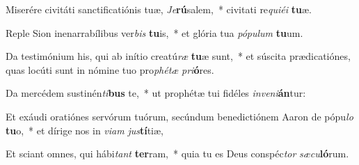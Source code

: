 \item Miserére civitáti sanctificatiónis tuæ, \textit{Je}\textbf{rú}salem,~* civitati re\textit{qui}\textit{é}\textit{i} \textbf{tu}æ.
\item Reple Sion inenarrabílibus ver\textit{bis} \textbf{tu}is,~* et glória tua \textit{pó}\textit{pu}\textit{lum} \textbf{tu}um.
\item Da testimónium his, qui ab inítio creatú\textit{ræ} \textbf{tu}æ sunt,~* et súscita prædicatiónes, quas locúti sunt in nómine tuo pro\textit{phé}\textit{tæ} \textit{pri}\textbf{ó}res.
\item Da mercédem sustinén\textit{ti}\textbf{bus} te,~* ut prophétæ tui fidéles \textit{in}\textit{ve}\textit{ni}\textbf{án}tur:
\item Et exáudi oratiónes servórum tuórum, secúndum benedictiónem Aaron de pópu\textit{lo} \textbf{tu}o,~* et dírige nos in \textit{vi}\textit{am} \textit{jus}\textbf{tí}tiæ,
\item Et sciant omnes, qui hábi\textit{tant} \textbf{ter}ram,~* quia tu es Deus conspéc\textit{tor} \textit{sæ}\textit{cu}\textbf{ló}rum.

